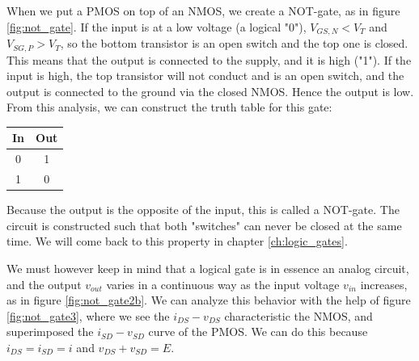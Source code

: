 When we put a PMOS on top of an NMOS, we create a NOT-gate, as in figure \ref{fig:not_gate}. If the input is at a low voltage (a logical "0"), $V_{GS, N} < V_T$ and $V_{SG, P} > V_T$, so the bottom transistor is an open switch and the top one is closed. This means that the output is connected to the supply, and it is high ("1"). If the input is high, the top transistor will not conduct and is an open switch, and the output is connected to the ground via the closed NMOS. Hence the output is low. From this analysis, we can construct the truth table for this gate:\\



\begin{minipage}{.2\textwidth}
	\begin{center}
		\begin{tabular}{|c|c|}
			\hline
			In  & Out \\
			\hline\hline
			0 & 1 \\
			\hline
			1 & 0 \\
			\hline
		\end{tabular}
	\end{center}
\end{minipage}%
\begin{minipage}{.8\textwidth}
	Because the output is the opposite of the input, this is called a NOT-gate. The circuit is constructed such that both "switches" can never be closed at the same time. We will come back to this property in chapter \ref{ch:logic_gates}.\\
\end{minipage}

We must however keep in mind that a logical gate is in essence an analog circuit, and the output $v_{out}$ varies in a continuous way as the input voltage $v_{in}$ increases, as in figure \ref{fig:not_gate2b}. We can analyze this behavior with the help of figure \ref{fig:not_gate3}, where we see the $i_{DS} - v_{DS}$ characteristic the NMOS, and superimposed the $i_{SD} - v_{SD}$ curve of the PMOS. We can do this because $i_{DS} = i_{SD} = i$ and $v_{DS} + v_{SD} = E$.\\

